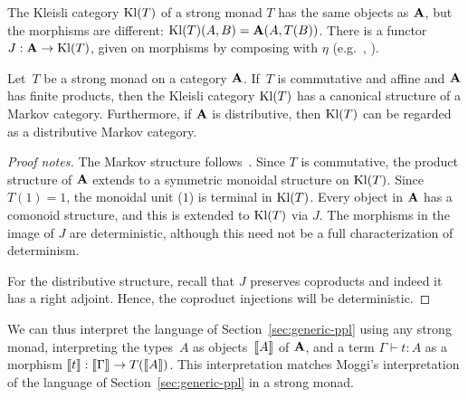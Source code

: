 The Kleisli category $\mathrm{Kl}(T)$ of a strong monad $T$ has the same objects as $\mathbf{A}$,
but the morphisms are different: $\mathrm{Kl}(T)(A,B)=\mathbf{A}(A,T(B))$.
There is a functor $J:\mathbf{A}\to\mathrm{Kl}(T)$, given on morphisms by composing
with $\eta$ (e.g.~\cite[\S VI.5]{maclane}, \cite{moggi-computational-lambda}).
\begin{proposition}\label{prop:distr-affine-monad}
        Let\, $T$ be a strong monad on a category $\mathbf{A}$. If\, $T$ is commutative
        and affine and $\mathbf{A}$ has finite products, then
the Kleisli category $\mathrm{Kl}(T)$ has a canonical structure of a Markov
category. Furthermore, if $\mathbf{A}$ is distributive, then $\mathrm{Kl}(T)$ can be regarded as a distributive Markov category. 
\end{proposition}
\begin{proof}[Proof notes]
  The Markov structure follows~\cite[\S3]{fritz}. Since $T$ is commutative, the product structure of $\mathbf{A}$ extends
  to a symmetric monoidal structure on $\mathrm{Kl}(T)$.
  Since $T(1)=1$, the monoidal unit ($1$) is terminal in $\mathrm{Kl}(T)$.
  Every object in $\mathbf{A}$ has a comonoid structure, and this is
  extended to $\mathrm{Kl}(T)$ via $J$. 
  The morphisms in the image of $J$ are deterministic, although this
  need not be a full characterization of determinism.
  
  For the distributive structure, recall that $J$ preserves
  coproducts and indeed it has a right adjoint. Hence, the coproduct injections will be deterministic.
\end{proof}
We can thus interpret the language of Section~\ref{sec:generic-ppl} using any
strong monad, interpreting the types~$A$ as objects~$\llbracket A\rrbracket$ of $\mathbf{A}$,
and a term $\Gamma\vdash t:A$ as a morphism
$\llbracket t\rrbracket:\llbracket \Gamma\rrbracket \to T(\llbracket A\rrbracket)$.
This interpretation matches Moggi's interpretation of the language of Section~\ref{sec:generic-ppl} in a strong monad. 

